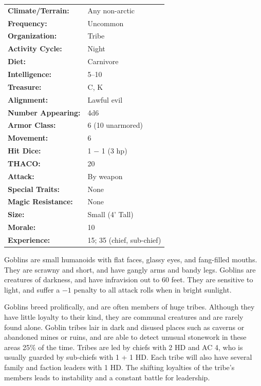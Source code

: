 \begin{multicols}{2}
\begin{minipage}{\columnwidth}
\noindent
\begin{tabular}{p{}p{}}
\textbf{Climate/Terrain:}	& Any non-arctic \\
\textbf{Frequency:} 		& Uncommon \\
\textbf{Organization:} 		& Tribe \\
\textbf{Activity Cycle:} 	& Night \\
\textbf{Diet:} 				& Carnivore \\
\textbf{Intelligence:} 		& 5--10 \\
\textbf{Treasure:} 			& C, K \\
\textbf{Alignment:} 		& Lawful evil \\
\hline
\textbf{Number Appearing:} 	& 4d6 \\
\textbf{Armor Class:} 		& 6 (10 unarmored) \\
\textbf{Movement:} 			& 6 \\
\textbf{Hit Dice:} 			& 1 $-$ 1 (3 hp) \\
\textbf{THACO:} 			& 20 \\
\textbf{Attack:} 			& By weapon \\
\textbf{Special Traits:} & None \\
\textbf{Magic Resistance:} 	& None \\
\textbf{Size:} 				& Small (4' Tall) \\
\textbf{Morale:} 			& 10 \\
\textbf{Experience:} 		& 15; 35 (chief, sub-chief) \\
\end{tabular}

\end{minipage}

Goblins are small humanoids with flat faces, glassy eyes, and fang-filled mouths. They are scrawny and short, and have gangly arms and bandy legs. Goblins are creatures of darkness, and have infravision out to 60 feet. They are sensitive to light, and suffer a $-1$ penalty to all attack rolls when in bright sunlight.

Goblins breed prolifically, and are often members of huge tribes. Although they have little loyalty to their kind, they are communal creatures and are rarely found alone. Goblin tribes lair in dark and disused places such as caverns or abandoned mines or ruins, and are able to detect unusual stonework in these areas 25\% of the time. Tribes are led by chiefs with 2 HD and AC 4, who is usually guarded by sub-chiefs with 1 + 1 HD. Each tribe will also have several family and faction leaders with 1 HD. The shifting loyalties of the tribe's members leads to instability and a constant battle for leadership.


\end{multicols}
